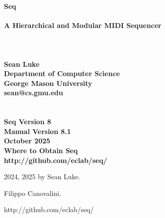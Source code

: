 \documentclass[twoside,10pt]{article}
\newcommand\booktitle{Seq\\~\vspace{0em}\\\LARGE A Hierarchical and Modular MIDI Sequencer\\}
\newcommand\reference[1]{\vspace{0.5em}\hfill{\parbox{6in}{\raggedleft\noindent\textsf{#1}}}}
\begin{document}

\noindent\Huge\bf \booktitle\\
\\
\\
\Large\bf Sean Luke\\
{\large\rm 
Department of Computer Science\\
George Mason University\\
sean@cs.gmu.edu}\\
\\
\\
\large\rm {\bf Seq Version 8}\\
\large\rm {\bf Manual Version 8.1}\\
\large\rm  October 2025\\

\vspace{5in}
\noindent\Large\bf Where to Obtain Seq\\
\large\rm http:/\!/github.com/eclab/seq/

\clearpage

\small 
{}  2024, 2025 by Sean Luke.

\vspace{0.25in}
 Filippo Canovalini.

\vspace{0.25in}


\reference{http:/\!/github.com/eclab/seq/}

\vspace{0.15in}
\end{document}
